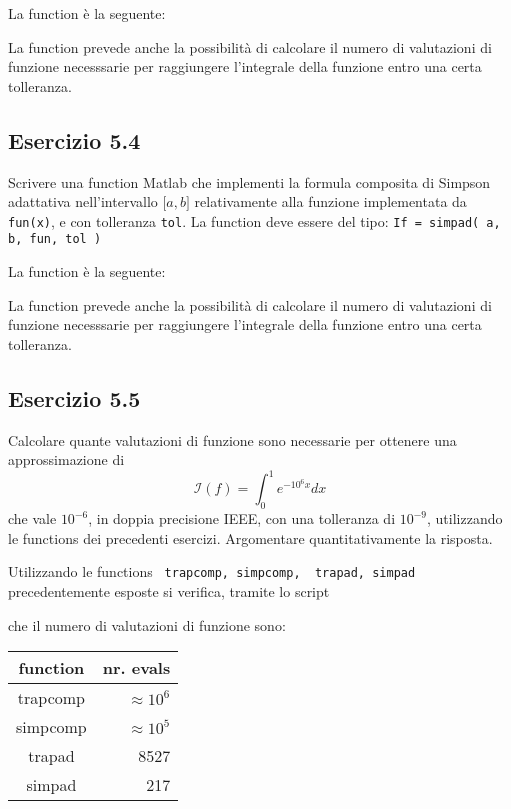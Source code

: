 	La function è la seguente:

La function prevede anche la possibilità di calcolare il numero di valutazioni di funzione necesssarie per raggiungere l'integrale della funzione entro una certa tolleranza.



	\subsection{Esercizio 5.4}
	Scrivere una function Matlab che implementi la formula composita di Simpson adattativa nell’intervallo $\lbrack a,b \rbrack$  relativamente alla funzione implementata da \lstinline{fun(x)}, e con tolleranza \lstinline{tol}. La function deve essere del tipo: \lstinline{If = simpad( a, b, fun, tol )}
	
		La function è la seguente:

La function prevede anche la possibilità di calcolare il numero di valutazioni di funzione necesssarie per raggiungere l'integrale della funzione entro una certa tolleranza.



	\subsection{Esercizio 5.5}
	Calcolare quante valutazioni di funzione sono necessarie per ottenere una approssimazione di
\begin{equation*}
	\mathcal{I}(f) = \int_{0}^{1} e^{-10^6x}dx
\end{equation*}
che vale $10^{-6}$, in doppia precisione IEEE, con una tolleranza di $10^{-9}$, utilizzando le functions dei precedenti esercizi. Argomentare quantitativamente la risposta.

Utilizzando le functions \lstinline{ trapcomp, simpcomp,  trapad, simpad } precedentemente esposte si verifica, tramite lo script 

 che il numero di valutazioni di funzione sono: 
\begin{tabular}{c | r}
	\textbf{function} & \textbf{nr. evals}\\
	\hline
	trapcomp & $\approx 10^{6}$ \\
	simpcomp & $\approx 10^{5}$ \\
	trapad & 8527 \\ 
	simpad & 217 
\end{tabular}